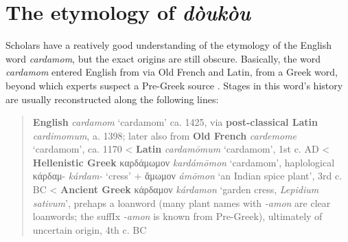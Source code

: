 \documentclass[12pt]{article}
\begin{document}





\section{The etymology of \textit{dòukòu}}\label{sec:etymology}

Scholars have a reatively good understanding of the etymology of the English word \textit{cardamom}, but the exact origins are still obscure. Basically, the word \textit{cardamom} entered English from via Old French and Latin, from a Greek word, beyond which experts suspect a Pre-Greek source \parencite{beekes_2010_etymological}. Stages in this word's history are usually reconstructed along the following lines:

\begin{quote}
    \textbf{English} \textit{cardamom} `cardamom' ca. 1425, via \textbf{post-classical Latin} \textit{cardimomum}, a. 1398; 
    later also from \textbf{Old French} \textit{cardemome} `cardamom', ca. 1170
    < \textbf{Latin} \textit{cardamōmum} `cardamom', 1st c. AD
    < \textbf{Hellenistic Greek} {καρδάμωμον} \textit{kardámōmon} `cardamom', haplological κάρδαμ- \textit{kárdam-} `cress' + ἄμωμον \textit{ámōmon} `an Indian spice plant', 3rd c. BC
    < \textbf{Ancient Greek} {κάρδαμον} \textit{kárdamon} `garden cress, \textit{Lepidium sativum}', prehaps a loanword (many plant names with \textit{-amon} are clear loanwords; the suffIx \textit{-amon} is known from Pre-Greek), ultimately of uncertain origin, 4th c. BC 
    \parencites[s.v. cardamom]{oed}[s.v. cardamome]{tlfi}[s.v. cardamomum]{lewis_1879_latin}[s.v. καρδάμωμον]{liddell_1940_greekenglish}[s.v. κάρδαμον]{liddell_1940_greekenglish}[644]{beekes_2010_etymological}
\end{quote}

\end{document}
